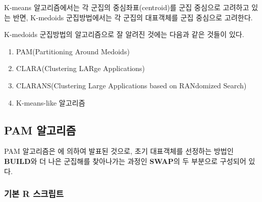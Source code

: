 \documentclass[]{book}
\newenvironment{Shaded}{\begin{snugshade}}{\end{snugshade}}
\newcommand{\DataTypeTok}[1]{\textcolor[rgb]{0.13,0.29,0.53}{#1}}
\newcommand{\DecValTok}[1]{\textcolor[rgb]{0.00,0.00,0.81}{#1}}
\newcommand{\KeywordTok}[1]{\textcolor[rgb]{0.13,0.29,0.53}{\textbf{#1}}}
\newcommand{\NormalTok}[1]{#1}
\newcommand{\OperatorTok}[1]{\textcolor[rgb]{0.81,0.36,0.00}{\textbf{#1}}}
\newcommand{\OtherTok}[1]{\textcolor[rgb]{0.56,0.35,0.01}{#1}}
\newcommand{\StringTok}[1]{\textcolor[rgb]{0.31,0.60,0.02}{#1}}
\providecommand{\tightlist}{%
  \setlength{\itemsep}{0pt}\setlength{\parskip}{0pt}}
\begin{document}
K-means 알고리즘에서는 각 군집의 중심좌표(centroid)를 군집 중심으로 고려하고 있는 반면, K-medoids 군집방법에서는 각 군집의 대표객체를 군집 중심으로 고려한다.

K-medoids 군집방법의 알고리즘으로 잘 알려진 것에는 다음과 같은 것들이 있다.

\begin{enumerate}
\def\labelenumi{\arabic{enumi}.}
\tightlist
\item
  PAM(Partitioning Around Medoids)
\item
  CLARA(Clustering LARge Applications)
\item
  CLARANS(Clustering Large Applications based on RANdomized Search)
\item
  K-means-like 알고리즘
\end{enumerate}

\hypertarget{pam}{%
\subsection{PAM 알고리즘}\label{pam}}

PAM 알고리즘은 \citet{kaufman1990finding} 에 의하여 발표된 것으로, 초기 대표객체를 선정하는 방법인 \textbf{BUILD}와 더 나은 군집해를 찾아나가는 과정인 \textbf{SWAP}의 두 부분으로 구성되어 있다.

\hypertarget{pam-basic-script}{%
\subsubsection{기본 R 스크립트}\label{pam-basic-script}}

\begin{Shaded}
\end{Shaded}
\end{document}
